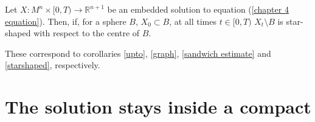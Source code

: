 \begin{cor}
	Let $ X : M^n \times [0, T) \to \mathbb{R}^{n+1} $ be an embedded solution to equation (\ref{chapter 4 equation}). Then, if, for a sphere $B$, $X_0\subset B$, at all times $t \in [0, T)$ $X_t\setminus B$ is star-shaped with respect to the centre of $B$.\label{starshaped ch4}
\end{cor}

These correspond to corollaries \ref{upto}, \ref{graph}, \ref{sandwich estimate} and \ref{starshaped}, respectively.
 
\section{The solution stays inside a compact}\label{The solution stays inside a compact}

